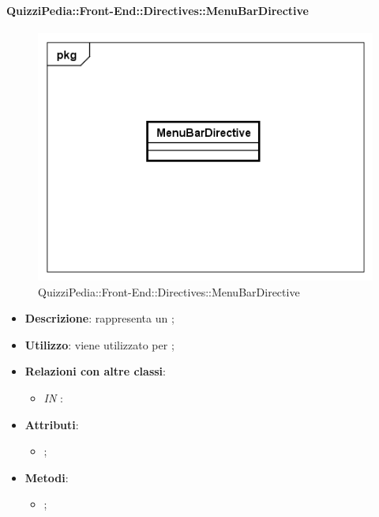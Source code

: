 \paragraph{QuizziPedia::Front-End::Directives::MenuBarDirective}

\label{QuizziPedia::Front-End::Directives::MenuBarDirective}

\begin{figure}[h]
	\centering
	\includegraphics[scale=0.5,keepaspectratio]{UML/Classi/Front-End/QuizziPedia_Front-end_Directives_MenuBarDirective.png}
	\caption{QuizziPedia::Front-End::Directives::MenuBarDirective}
\end{figure}

\begin{itemize}
	\item \textbf{Descrizione}: rappresenta un ;
	\item \textbf{Utilizzo}: viene utilizzato per ;
	\item \textbf{Relazioni con altre classi}: 
	\begin{itemize}
		\item \textit{IN} \texttt{}: 
	\end{itemize}
	\item \textbf{Attributi}: 
	\begin{itemize}
		\item ;
	\end{itemize}
	\item \textbf{Metodi}: 
	\begin{itemize}
		\item ;
	\end{itemize}
\end{itemize}

